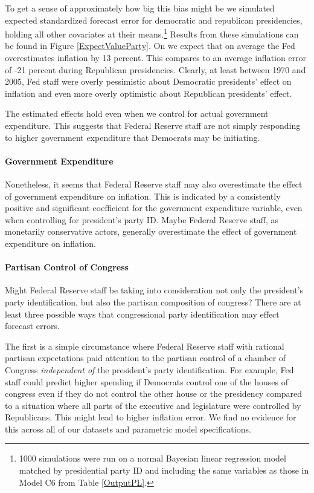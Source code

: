 \documentclass[a4paper]{article}\usepackage{graphicx, color}
\begin{document}
To get a sense of approximately how big this bias might be we simulated expected standardized forecast error for democratic and republican presidencies, holding all other covariates at their means.\footnote{1000 simulations were run on a normal Bayesian linear regression model matched by presidential party ID and including the same variables as those in Model C6 from Table \ref{OutputPL}.} Results from these simulations can be found in Figure \ref{ExpectValueParty}. On we expect that on average the Fed overestimates inflation by 13 percent. This compares to an average inflation error of -21 percent during Republican presidencies. Clearly, at least between 1970 and 2005, Fed staff were overly pessimistic about Democratic presidents' effect on inflation and even more overly optimistic about Republican presidents' effect. 

The estimated effects hold even when we control for actual government expenditure. This suggests that Federal Reserve staff are not simply responding to higher government expenditure that Democrats may be initiating.

\paragraph{Government Expenditure}

Nonetheless, it seems that Federal Reserve staff may also overestimate the effect of government expenditure on inflation. This is indicated by a consistently positive and significant coefficient for the government expenditure variable, even when controlling for president's party ID. Maybe Federal Reserve staff, as monetarily conservative actors, generally overestimate the effect of government expenditure on inflation.  

\paragraph{Partisan Control of Congress}

Might Federal Reserve staff be taking into consideration not only the president's party identification, but also the partisan composition of congress? There are at least three possible ways that congressional party identification may effect forecast errors. 

The first is a simple circumstance where Federal Reserve staff with rational partisan expectations paid attention to the partisan control of a chamber of Congress {\emph{independent of}} the president's party identification.  For example, Fed staff could predict higher spending if Democrats control one of the houses of congress even if they do not control the other house or the presidency compared to a situation where all parts of the executive and legislature were controlled by Republicans. This might lead to higher inflation error. We find no evidence for this across all of our datasets and parametric model specifications. 
\end{document}
